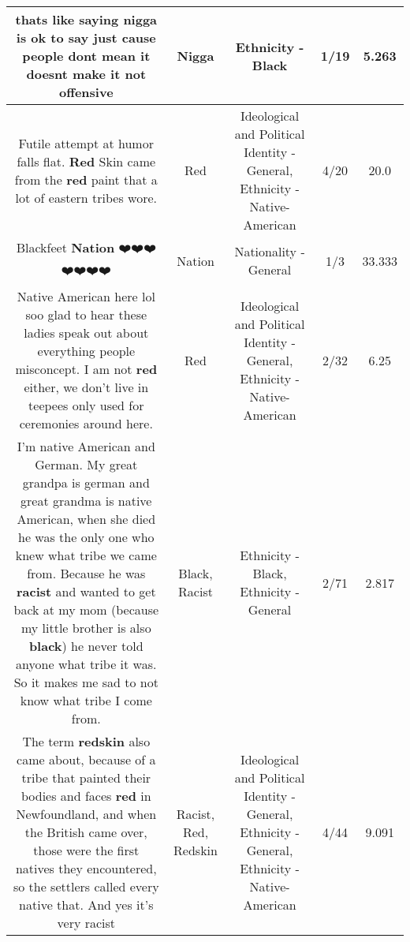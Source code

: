 \documentclass[11pt]{article}
\newlength\mylength
\begin{document}
\begin{center}
\begin{longtable}{|C{.65\mylength}|C{.30\mylength}|C{.12\mylength}|C{.12\mylength}|C{.12\mylength}|}
  \small thats like saying \textbf{nigga} is ok to say just cause people dont mean it doesnt make it not offensive\normalsize   & Nigga & Ethnicity - Black & 1/19 & 5.263 \\  \hline
  \small Futile attempt at humor falls flat. \textbf{R\textbf{ed}} Skin came from the \textbf{r\textbf{ed}} paint that a lot of eastern tribes wore.\normalsize   & Red &  Ideological and Political Identity - General, Ethnicity - Native-American & 4/20 & 20.0 \\  \hline
  \small Blackfeet \textbf{Nation} ❤️❤️❤️❤️❤️❤️❤️\normalsize   & Nation & Nationality - General & 1/3 & 33.333 \\  \hline
  \small Native American here lol soo glad to hear these ladies speak out about everything people misconcept. I am not \textbf{r\textbf{ed}} either, we don't live in teepees only used for ceremonies around here.\normalsize   & Red &  Ideological and Political Identity - General, Ethnicity - Native-American & 2/32 & 6.25 \\  \hline
  \small I'm native American and German. My great grandpa is german and great grandma is native American, when she died he was the only one who knew what tribe we came from. Because he was \textbf{racist} and wanted to get back at my mom (because my little brother is also \textbf{black}) he never told anyone what tribe it was. So it makes me sad to not know what tribe I come from.\normalsize   & Black, Racist & Ethnicity - Black, Ethnicity - General & 2/71 & 2.817 \\  \hline
  \small The term \textbf{redskin} also came about, because of a tribe that painted their bodies and faces \textbf{r\textbf{ed}} in Newfoundland, and when the British came over, those were the first natives they encountered, so the settlers called every native that. And yes it's very racist\normalsize   & Racist, Red, Redskin &  Ideological and Political Identity - General, Ethnicity - General, Ethnicity - Native-American & 4/44 & 9.091 \\  \hline

\end{longtable}
\end{center}
\end{document}
